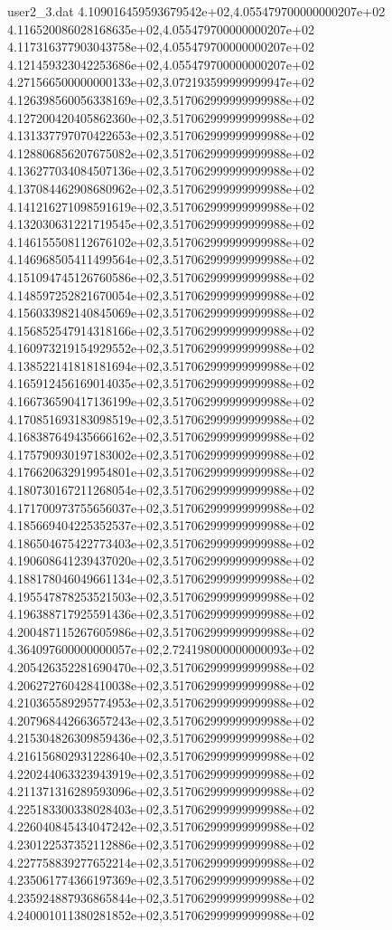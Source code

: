 \begin{filecontents}{user2_3.dat}
4.109016459593679542e+02,4.055479700000000207e+02
4.116520086028168635e+02,4.055479700000000207e+02
4.117316377903043758e+02,4.055479700000000207e+02
4.121459323042253686e+02,4.055479700000000207e+02
4.271566500000000133e+02,3.072193599999999947e+02
4.126398560056338169e+02,3.517062999999999988e+02
4.127200420405862360e+02,3.517062999999999988e+02
4.131337797070422653e+02,3.517062999999999988e+02
4.128806856207675082e+02,3.517062999999999988e+02
4.136277034084507136e+02,3.517062999999999988e+02
4.137084462908680962e+02,3.517062999999999988e+02
4.141216271098591619e+02,3.517062999999999988e+02
4.132030631221719545e+02,3.517062999999999988e+02
4.146155508112676102e+02,3.517062999999999988e+02
4.146968505411499564e+02,3.517062999999999988e+02
4.151094745126760586e+02,3.517062999999999988e+02
4.148597252821670054e+02,3.517062999999999988e+02
4.156033982140845069e+02,3.517062999999999988e+02
4.156852547914318166e+02,3.517062999999999988e+02
4.160973219154929552e+02,3.517062999999999988e+02
4.138522141818181694e+02,3.517062999999999988e+02
4.165912456169014035e+02,3.517062999999999988e+02
4.166736590417136199e+02,3.517062999999999988e+02
4.170851693183098519e+02,3.517062999999999988e+02
4.168387649435666162e+02,3.517062999999999988e+02
4.175790930197183002e+02,3.517062999999999988e+02
4.176620632919954801e+02,3.517062999999999988e+02
4.180730167211268054e+02,3.517062999999999988e+02
4.171700973755656037e+02,3.517062999999999988e+02
4.185669404225352537e+02,3.517062999999999988e+02
4.186504675422773403e+02,3.517062999999999988e+02
4.190608641239437020e+02,3.517062999999999988e+02
4.188178046049661134e+02,3.517062999999999988e+02
4.195547878253521503e+02,3.517062999999999988e+02
4.196388717925591436e+02,3.517062999999999988e+02
4.200487115267605986e+02,3.517062999999999988e+02
4.364097600000000057e+02,2.724198000000000093e+02
4.205426352281690470e+02,3.517062999999999988e+02
4.206272760428410038e+02,3.517062999999999988e+02
4.210365589295774953e+02,3.517062999999999988e+02
4.207968442663657243e+02,3.517062999999999988e+02
4.215304826309859436e+02,3.517062999999999988e+02
4.216156802931228640e+02,3.517062999999999988e+02
4.220244063323943919e+02,3.517062999999999988e+02
4.211371316289593096e+02,3.517062999999999988e+02
4.225183300338028403e+02,3.517062999999999988e+02
4.226040845434047242e+02,3.517062999999999988e+02
4.230122537352112886e+02,3.517062999999999988e+02
4.227758839277652214e+02,3.517062999999999988e+02
4.235061774366197369e+02,3.517062999999999988e+02
4.235924887936865844e+02,3.517062999999999988e+02
4.240001011380281852e+02,3.517062999999999988e+02

\end{filecontents}
